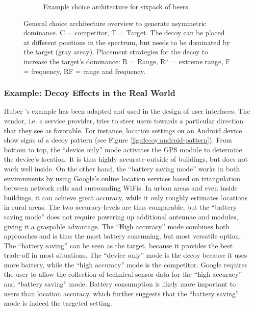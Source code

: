 \begin{figure}[t]
\begin{subfigure}[t]{0.49\textwidth}
		\caption{Example choice architecture for sixpack of beers.}
		\label{fig:decoy:beer-construction} 
	\end{subfigure}
	\caption{
		General choice architecture overview to generate asymmetric dominance. 
		C = competitor, T = Target. The decoy can be placed at different positions in the spectrum, but needs to be dominated by the target (gray areay). Placement strategies for the decoy to increase the target's dominance: R = Range, R* = extreme range, F = frequency, RF = range and frequency.
	} 
\end{figure}


\subsubsection{Example: Decoy Effects in the Real World}
Huber \etal's example has been adapted and used in the design of user interfaces. The vendor, i.e. a service provider, tries to steer users towards a particular direction that they see as favorable. For instance, location settings on an Android device show signs of a decoy pattern (see Figure \ref{fig:decoy:android-pattern}). From bottom to top, the ``device only'' mode activates the GPS module to determine the device's location. It is thus highly accurate outside of buildings, but does not work well inside. On the other hand, the ``battery saving mode'' works in both environments by using Google's online location services based on triangulation between network cells and surrounding WiFis. In urban areas and even inside buildings, it can achieve great accuracy, while it only roughly estimates locations in rural areas. The two accuracy-levels are thus comparable, but the ``battery saving mode'' does not require powering up additional antennae and modules, giving it a graspable advantage. The ``High accuracy'' mode combines both approaches and is thus the most battery consuming, but most versatile option. The ``battery saving'' can be seen as the target, because it provides the best trade-off in most situations. The ``device only'' mode is the decoy because it uses more battery, while the ``high accuracy'' mode is the competitor. Google requires the user to allow the collection of technical sensor data for the ``high accuracy'' and ``battery saving'' mode. Battery consumption is likely more important to users than location accuracy, which further suggests that the ``battery saving'' mode is indeed the targeted setting. 

